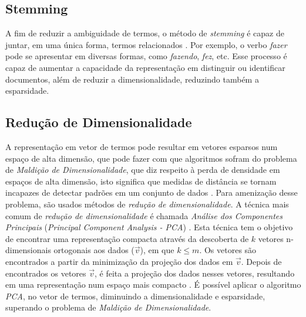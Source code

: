 \documentclass[
    12pt,                %
    oneside,            %
    a4paper,            %
    english,            %
    brazil                %
    ]{abntex2ppgsi}
\begin{document}
\begin{apendicesenv}

\subsection{Stemming}

A fim de reduzir a ambiguidade de termos, o método de \textit{stemming} é capaz de juntar, em uma única forma, termos relacionados \cite{Miner2012}. Por exemplo, o verbo \textit{fazer} pode se apresentar em diversas formas, como \textit{fazendo}, \textit{fez}, etc. Esse processo é capaz de aumentar a capacidade da representação em distinguir ou identificar documentos, além de reduzir a dimensionalidade, reduzindo também a esparsidade.

\subsection{Redução de Dimensionalidade}

A representação em vetor de termos pode resultar em vetores esparsos num espaço de alta dimensão, que pode fazer com que algoritmos sofram do problema de \textit{Maldição de Dimensionalidade}, que diz respeito à perda de densidade em espaços de alta dimensão, isto significa que medidas de distância se tornam incapazes de detectar padrões em um conjunto de dados \cite{Haykin2008}.
Para amenização desse problema, são usados métodos de \textit{redução de dimensionalidade}.
A técnica mais comum de \textit{redução de dimensionalidade} é chamada \textit{Análise dos Componentes Principais} (\textit{Principal Component Analysis - PCA}) \cite{Murphy2012}.
Esta técnica tem o objetivo de encontrar uma representação compacta através da descoberta de $k$ vetores n-dimensionais ortogonais aos dados ($\vec{v}$), em que $k \leq m$. Os vetores são encontrados a partir da minimização da projeção dos dados em $\vec{v}$.
Depois de encontrados os vetores $\vec{v}$, é feita a projeção dos dados nesses vetores, resultando em uma representação num espaço mais compacto \cite{Kamber2011}.
É possível aplicar o algoritmo \textit{PCA}, no vetor de termos, diminuindo a dimensionalidade e esparsidade, superando o problema de \textit{Maldição de Dimensionalidade}.






\end{apendicesenv}
\end{document}
